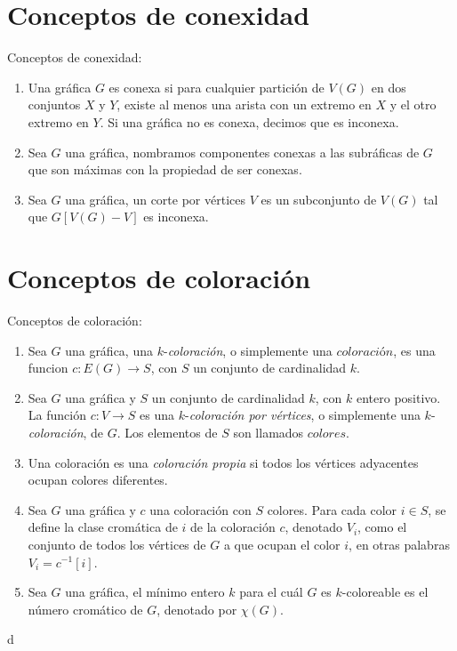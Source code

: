 \section{Conceptos de conexidad}
\label{sec:conexidad}

\begin{definicion} Conceptos de conexidad:
    \label{def:conexidad}
    \begin{enumerate}    
        \item Una gr\'afica $G$ es conexa si para cualquier partici\'on de
        $V(G)$ en dos conjuntos $X$ y $Y$, existe al menos una arista con un
        extremo en $X$ y el otro extremo en $Y$. Si una gr\'afica no es conexa,
        decimos que es inconexa.
        \item Sea $G$ una gr\'afica, nombramos componentes conexas a las
        subr\'aficas de $G$ que son m\'aximas con la propiedad de ser conexas.
        \item Sea $G$ una gr\'afica, un corte por v\'ertices $V$ es un
        subconjunto de $V(G)$ tal que $G[V(G)-V]$ es inconexa.
    \end{enumerate}
\end{definicion}

\section{Conceptos de coloraci\'on}
\label{sec:coloracion}

\begin{definicion} Conceptos de coloraci\'on:
    \label{def:coloracion}
    \begin{enumerate}
        \item Sea $G$ una gr\'afica, una $k$-\textit{coloraci\'on}, o
        simplemente una $\textit{coloraci\'on}$, es una funcion $c \colon
        E(G)\to S$, con $S$ un conjunto de cardinalidad $k$.
        \item Sea $G$ una gr\'afica y $S$ un conjunto de cardinalidad $k$, con
        $k$ entero positivo. La funci\'on $c: V \to S$ es una
        $k$-\textit{coloraci\'on por v\'ertices}, o simplemente una
        $k$-\textit{coloraci\'on}, de $G$. Los elementos de $S$ son llamados
        $\textit{colores}$.
        \item Una coloraci\'on es una \textit{coloraci\'on propia} si todos los
        v\'ertices adyacentes ocupan colores diferentes.
        \item Sea $G$ una gr\'afica y $c$ una coloraci\'on con $S$ colores. Para
        cada color $i \in S$, se define la clase crom\'atica de $i$ de la
        coloraci\'on $c$, denotado $V_i$, como el conjunto de todos los
        v\'ertices de $G$ a que ocupan el color $i$, en otras palabras $V_i =
        c^{-1}[i]$.
        \item  Sea $G$ una gr\'afica, el m\'inimo entero $k$ para el cu\'al $G$
        es $k$-coloreable es el n\'umero crom\'atico de $G$, denotado por
        $\chi(G)$.
    \end{enumerate}
\end{definicion}d


